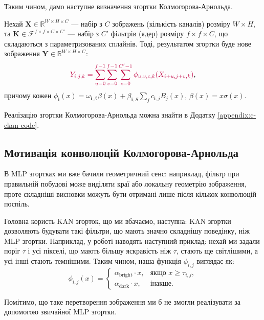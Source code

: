 Таким чином, дамо наступне визначення згортки Колмогорова-Арнольда.
\begin{definition}
    Нехай $\boldsymbol{X} \in \mathbb{R}^{W \times H \times C}$ --- набір з $C$
    зображень (кількість каналів) розміру $W \times H$, та $\boldsymbol{K} \in
    \mathcal{F}^{f \times f \times C \times C'}$ --- набір з $C'$ фільтрів
    (ядер) розміру $f \times f \times C$, що складаються з параметризованих
    сплайнів. Тоді, результатом згортки буде нове зображення $\boldsymbol{Y} \in
    \mathbb{R}^{W \times H \times C}$:
    \begin{equation}
        \textcolor{purple}{Y_{i,j,k} = \sum_{u=0}^{f-1} \sum_{v=0}^{f-1} \sum_{c=0}^{C'-1} \phi_{u,v,c,k}(X_{i+u,j+v,k})},
    \end{equation}
    причому кожен $\phi_{\boldsymbol{i}}(x) = \omega_{\boldsymbol{i},\beta}\beta(x)+\beta_{\boldsymbol{i},S} \sum_j c_{\boldsymbol{i},j}B_j(x)$,
    $\beta(x)=x\sigma(x)$.
\end{definition}

Реалізацію згортки Колмогорова-Арнольда можна знайти в Додатку \ref{appendix:c-ckan-code}.

\subsection{Мотивація конволюцій Колмогорова-Арнольда}

В MLP згортках ми вже бачили геометричний сенс: наприклад, фільтр при правильній
побудові може виділяти краї або локальну геометрію зображення, проте складніші
висновки можуть бути отримані лише після кількох конволюцій поспіль.

Головна користь KAN згорток, що ми вбачаємо, наступна: KAN згортки дозволяють
будувати такі фільтри, що мають значно складнішу поведінку, ніж MLP згортки.
Наприклад, у роботі \cite{kan-cnn} наводять наступний приклад: нехай ми задали
поріг $\tau$ і усі пікселі, що мають більшу яскравість ніж $\tau$, стають ще
світлішими, а усі інші стають темнішими. Таким чином, наша функція $\phi_{i,j}$
виглядає як:
\begin{equation*}
    \phi_{i,j}(x) = \begin{cases}
        \alpha_{\text{bright}}\cdot x, & \text{якщо } x \geq \tau_{i,j}, \\
        \alpha_{\text{dark}}\cdot x, & \text{інакше.}
    \end{cases}
\end{equation*}

Помітимо, що таке перетворення зображення ми б не змогли реалізувати за
допомогою звичайної MLP згортки.

